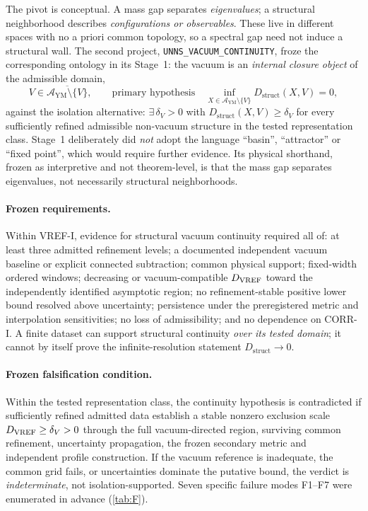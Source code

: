 \documentclass[11pt,a4paper]{article}
\theoremstyle{definition}
\theoremstyle{remark}
\newcommand{\Dstruct}{D_{\mathrm{struct}}}
\newcommand{\AYM}{\mathcal{A}_{\mathrm{YM}}}
\begin{document}
The pivot is conceptual. A mass gap separates \emph{eigenvalues}; a structural neighborhood describes \emph{configurations or observables}. These live in different spaces with no a priori common topology, so a spectral gap need not induce a structural wall. The second project, \texttt{UNNS\_VACUUM\_CONTINUITY}, froze the corresponding ontology in its Stage~1: the vacuum is an \emph{internal closure object} of the admissible domain,
\begin{equation}
V\in\overline{\AYM\setminus\{V\}},\qquad\text{primary hypothesis}\quad \inf_{X\in\AYM\setminus\{V\}}\Dstruct(X,V)=0,
\end{equation}
against the isolation alternative: $\exists\,\delta_V>0$ with $\Dstruct(X,V)\ge\delta_V$ for every sufficiently refined admissible non-vacuum structure in the tested representation class. Stage~1 deliberately did \emph{not} adopt the language ``basin'', ``attractor'' or ``fixed point'', which would require further evidence. Its physical shorthand, frozen as interpretive and not theorem-level, is that the mass gap separates eigenvalues, not necessarily structural neighborhoods.

\paragraph{Frozen requirements.} Within VREF-I, evidence for structural vacuum continuity required all of: at least three admitted refinement levels; a documented independent vacuum baseline or explicit connected subtraction; common physical support; fixed-width ordered windows; decreasing or vacuum-compatible $D_{\rm VREF}$ toward the independently identified asymptotic region; no refinement-stable positive lower bound resolved above uncertainty; persistence under the preregistered metric and interpolation sensitivities; no loss of admissibility; and no dependence on CORR-I. A finite dataset can support structural continuity \emph{over its tested domain}; it cannot by itself prove the infinite-resolution statement $\Dstruct\to0$.

\paragraph{Frozen falsification condition.} Within the tested representation class, the continuity hypothesis is contradicted if sufficiently refined admitted data establish a stable nonzero exclusion scale $D_{\rm VREF}\ge\delta_V>0$ through the full vacuum-directed region, surviving common refinement, uncertainty propagation, the frozen secondary metric and independent profile construction. If the vacuum reference is inadequate, the common grid fails, or uncertainties dominate the putative bound, the verdict is \emph{indeterminate}, not isolation-supported. Seven specific failure modes F1--F7 were enumerated in advance (\cref{tab:F}).
\end{document}
